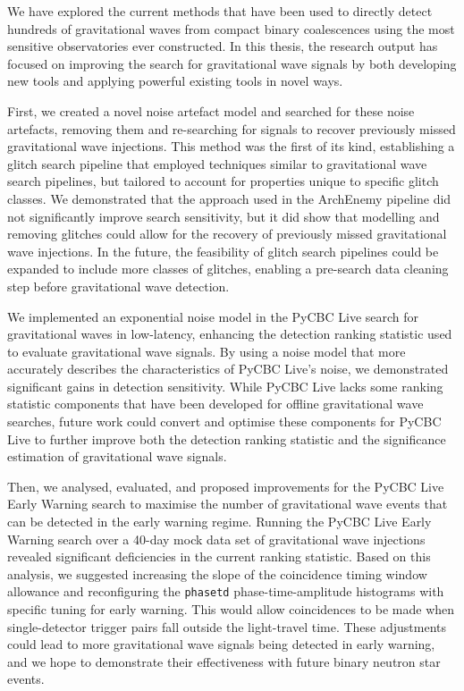 We have explored the current methods that have been used to directly detect hundreds of gravitational waves from compact binary coalescences using the most sensitive observatories ever constructed. In this thesis, the research output has focused on improving the search for gravitational wave signals by both developing new tools and applying powerful existing tools in novel ways.

First, we created a novel \scladj noise artefact model and searched for these noise artefacts, removing them and re-searching for signals to recover previously missed gravitational wave injections. This method was the first of its kind, establishing a glitch search pipeline that employed techniques similar to gravitational wave search pipelines, but tailored to account for properties unique to specific glitch classes. We demonstrated that the approach used in the ArchEnemy pipeline did not significantly improve search sensitivity, but it did show that modelling and removing glitches could allow for the recovery of previously missed gravitational wave injections. In the future, the feasibility of glitch search pipelines could be expanded to include more classes of glitches, enabling a pre-search data cleaning step before gravitational wave detection.

We implemented an exponential noise model in the PyCBC Live search for gravitational waves in low-latency, enhancing the detection ranking statistic used to evaluate gravitational wave signals. By using a noise model that more accurately describes the characteristics of PyCBC Live’s noise, we demonstrated significant gains in detection sensitivity. While PyCBC Live lacks some ranking statistic components that have been developed for offline gravitational wave searches, future work could convert and optimise these components for PyCBC Live to further improve both the detection ranking statistic and the significance estimation of gravitational wave signals.

Then, we analysed, evaluated, and proposed improvements for the PyCBC Live Early Warning search to maximise the number of gravitational wave events that can be detected in the early warning regime. Running the PyCBC Live Early Warning search over a 40-day mock data set of gravitational wave injections revealed significant deficiencies in the current ranking statistic. Based on this analysis, we suggested increasing the slope of the coincidence timing window allowance and reconfiguring the \texttt{phasetd} phase-time-amplitude histograms with specific tuning for early warning. This would allow coincidences to be made when single-detector trigger pairs fall outside the light-travel time. These adjustments could lead to more gravitational wave signals being detected in early warning, and we hope to demonstrate their effectiveness with future binary neutron star events.

